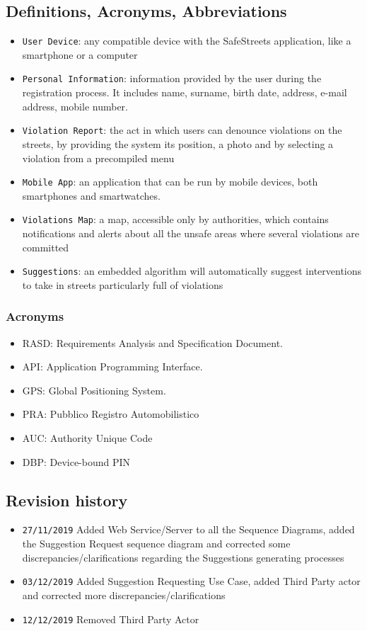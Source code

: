 \documentclass[12pt,a4paper]{article}
\begin{document}
\subsection{Definitions, Acronyms, Abbreviations}
			\begin{itemize}
				\item \texttt{User Device}: any compatible device with the SafeStreets application, like a smartphone or a computer
				\item \texttt{Personal Information}: information provided by the user during the registration process. It includes name, surname, birth date, address, e-mail address, mobile number.
				\item \texttt{Violation Report}: the act in which users can denounce violations on the streets, by providing the system its position, a photo and by selecting a violation from a precompiled menu
				\item \texttt{Mobile App}: an application that can be run by mobile devices, both smartphones and smartwatches.
				\item \texttt{Violations Map}: a map, accessible only by authorities, which contains notifications and alerts about all the unsafe areas where several violations are committed
				\item \texttt{Suggestions}: an embedded algorithm will automatically suggest interventions to take in streets particularly full of violations
			\end{itemize}
		\subsubsection{Acronyms}
			\begin{itemize}
				\item RASD: Requirements Analysis and Specification Document.
				\item API: Application Programming Interface.
				\item GPS: Global Positioning System.
				\item PRA: Pubblico Registro Automobilistico
				\item AUC: Authority Unique Code
				\item DBP: Device-bound PIN
			\end{itemize}
\newpage
\subsection{Revision history}
\begin{itemize}
\item \texttt{27/11/2019} Added Web Service/Server to all the Sequence Diagrams, added the Suggestion Request sequence diagram and corrected some discrepancies/clarifications regarding the Suggestions generating processes
\item \texttt{03/12/2019} Added Suggestion Requesting Use Case, added Third Party actor and corrected more discrepancies/clarifications
\item \texttt{12/12/2019} Removed Third Party Actor
\end{itemize}
\end{document}
